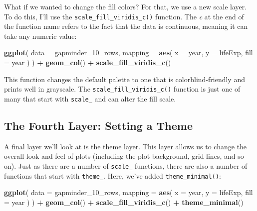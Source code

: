 \documentclass[
]{book}
\newenvironment{Shaded}{\begin{snugshade}}{\end{snugshade}}
\newcommand{\AttributeTok}[1]{\textcolor[rgb]{0.13,0.29,0.53}{#1}}
\newcommand{\FunctionTok}[1]{\textcolor[rgb]{0.13,0.29,0.53}{\textbf{#1}}}
\newcommand{\NormalTok}[1]{#1}
\newcommand{\SpecialCharTok}[1]{\textcolor[rgb]{0.81,0.36,0.00}{\textbf{#1}}}
\begin{document}
What if we wanted to change the fill colors? For that, we use a new scale layer. To do this, I'll use the \texttt{scale\_fill\_viridis\_c()} function. The \emph{c} at the end of the function name refers to the fact that the data is continuous, meaning it can take any numeric value:

\begin{Shaded}
\begin{Highlighting}[]
\FunctionTok{ggplot}\NormalTok{(}
  \AttributeTok{data =}\NormalTok{ gapminder\_10\_rows,}
  \AttributeTok{mapping =} \FunctionTok{aes}\NormalTok{(}
    \AttributeTok{x =}\NormalTok{ year,}
    \AttributeTok{y =}\NormalTok{ lifeExp,}
    \AttributeTok{fill =}\NormalTok{ year}
\NormalTok{  )}
\NormalTok{) }\SpecialCharTok{+}
  \FunctionTok{geom\_col}\NormalTok{() }\SpecialCharTok{+}
  \FunctionTok{scale\_fill\_viridis\_c}\NormalTok{()}
\end{Highlighting}
\end{Shaded}

This function changes the default palette to one that is colorblind-friendly and prints well in grayscale. The \texttt{scale\_fill\_viridis\_c()} function is just one of many that start with \texttt{scale\_} and can alter the fill scale.

\hypertarget{the-fourth-layer-setting-a-theme}{%
\subsection*{The Fourth Layer: Setting a Theme}\label{the-fourth-layer-setting-a-theme}}

A final layer we'll look at is the theme layer. This layer allows us to change the overall look-and-feel of plots (including the plot background, grid lines, and so on). Just as there are a number of \texttt{scale\_} functions, there are also a number of functions that start with \texttt{theme\_}. Here, we've added \texttt{theme\_minimal()}:

\begin{Shaded}
\begin{Highlighting}[]
\FunctionTok{ggplot}\NormalTok{(}
  \AttributeTok{data =}\NormalTok{ gapminder\_10\_rows,}
  \AttributeTok{mapping =} \FunctionTok{aes}\NormalTok{(}
    \AttributeTok{x =}\NormalTok{ year,}
    \AttributeTok{y =}\NormalTok{ lifeExp,}
    \AttributeTok{fill =}\NormalTok{ year}
\NormalTok{  )}
\NormalTok{) }\SpecialCharTok{+}
  \FunctionTok{geom\_col}\NormalTok{() }\SpecialCharTok{+}
  \FunctionTok{scale\_fill\_viridis\_c}\NormalTok{() }\SpecialCharTok{+}
  \FunctionTok{theme\_minimal}\NormalTok{()}
\end{Highlighting}
\end{Shaded}
\end{document}
